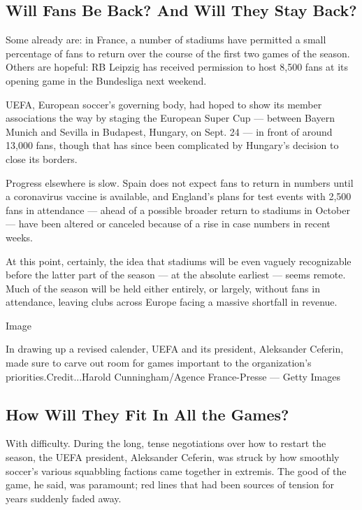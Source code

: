 \hypertarget{will-fans-be-back-and-will-they-stay-back}{%
\subsection{Will Fans Be Back? And Will They Stay
Back?}\label{will-fans-be-back-and-will-they-stay-back}}

Some already are: in France, a number of stadiums have permitted a small
percentage of fans to return over the course of the first two games of
the season. Others are hopeful: RB Leipzig has received permission to
host 8,500 fans at its opening game in the Bundesliga next weekend.

UEFA, European soccer's governing body, had hoped to show its member
associations the way by staging the European Super Cup --- between
Bayern Munich and Sevilla in Budapest, Hungary, on Sept. 24 --- in front
of around 13,000 fans, though that has since been complicated by
Hungary's decision to close its borders.

Progress elsewhere is slow. Spain does not expect fans to return in
numbers until a coronavirus vaccine is available, and England's plans
for test events with 2,500 fans in attendance --- ahead of a possible
broader return to stadiums in October --- have been altered or canceled
because of a rise in case numbers in recent weeks.

At this point, certainly, the idea that stadiums will be even vaguely
recognizable before the latter part of the season --- at the absolute
earliest --- seems remote. Much of the season will be held either
entirely, or largely, without fans in attendance, leaving clubs across
Europe facing a massive shortfall in revenue.

Image

In drawing up a revised calender, UEFA and its president, Aleksander
Ceferin, made sure to carve out room for games important to the
organization's priorities.Credit...Harold Cunningham/Agence
France-Presse --- Getty Images

\hypertarget{how-will-they-fit-in-all-the-games}{%
\subsection{How Will They Fit In All the
Games?}\label{how-will-they-fit-in-all-the-games}}

With difficulty. During the long, tense negotiations over how to restart
the season, the UEFA president, Aleksander Ceferin, was struck by how
smoothly soccer's various squabbling factions came together in extremis.
The good of the game, he said, was paramount; red lines that had been
sources of tension for years suddenly faded away.

